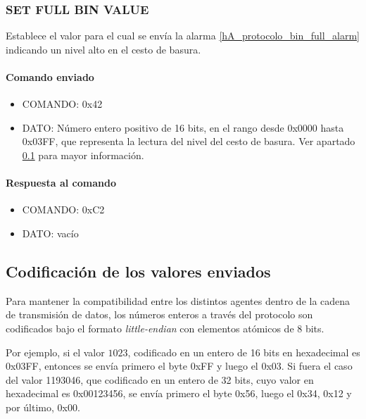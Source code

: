\subsubsection{SET FULL BIN VALUE}
\label{hA_protocolo_set_battery_empty_value}

Establece el valor para el cual se env\'ia la alarma \ref{hA_protocolo_bin_full_alarm} indicando un nivel alto en el cesto de basura.

\paragraph*{Comando enviado}

\begin{itemize}
	\item{COMANDO:} 0x42
	\item{DATO:} N\'umero entero positivo de 16 bits, en el rango desde 0x0000 hasta 0x03FF,
		que representa la lectura del nivel del cesto de basura.
		Ver apartado \ref{hA_protocolo_codificacion} para mayor informaci\'on.
\end{itemize}

\paragraph*{Respuesta al comando}

\begin{itemize}
	\item{COMANDO:} 0xC2
	\item{DATO:} vac\'io
\end{itemize}

\subsection{Codificaci\'on de los valores enviados}
\label{hA_protocolo_codificacion}

Para mantener la compatibilidad entre los distintos agentes dentro de la cadena de transmisi\'on de datos,
los n\'umeros enteros a trav\'es del protocolo son codificados bajo el formato \emph{little-endian} con elementos at\'omicos de 8 bits.

Por ejemplo, si el valor $1023$, codificado en un entero de 16 bits en hexadecimal es 0x03FF,
entonces se env\'ia primero el byte 0xFF y luego el 0x03.
Si fuera el caso del valor 1193046, que codificado en un entero de 32 bits, cuyo valor en hexadecimal es 0x00123456,
se env\'ia primero el byte 0x56, luego el 0x34, 0x12 y por \'ultimo, 0x00.

